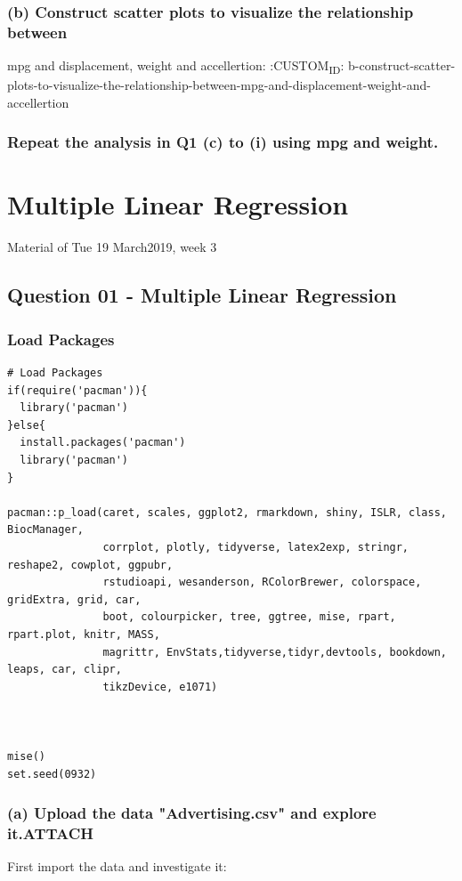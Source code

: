 \documentclass[11pt]{article}
\begin{document}
\subsubsection{(b) Construct scatter plots to visualize the relationship between}
\label{sec:org9a78e63}
mpg and displacement, weight and accellertion:
:CUSTOM\textsubscript{ID}: b-construct-scatter-plots-to-visualize-the-relationship-between-mpg-and-displacement-weight-and-accellertion
\subsubsection{Repeat the analysis in Q1 (c) to (i) using mpg and weight.}
\label{sec:orgc666646}
\section{Multiple Linear Regression}
\label{sec:org6309502}
Material of Tue 19 March2019, week 3

\subsection{Question 01 - Multiple Linear Regression}
\label{sec:orgc6c919e}
\subsubsection{Load Packages}
\label{sec:orgbb30466}

\begin{verbatim}
# Load Packages
if(require('pacman')){
  library('pacman')
}else{
  install.packages('pacman')
  library('pacman')
}

pacman::p_load(caret, scales, ggplot2, rmarkdown, shiny, ISLR, class, BiocManager,
               corrplot, plotly, tidyverse, latex2exp, stringr, reshape2, cowplot, ggpubr,
               rstudioapi, wesanderson, RColorBrewer, colorspace, gridExtra, grid, car,
               boot, colourpicker, tree, ggtree, mise, rpart, rpart.plot, knitr, MASS,
               magrittr, EnvStats,tidyverse,tidyr,devtools, bookdown, leaps, car, clipr,
               tikzDevice, e1071)



mise()
set.seed(0932)
\end{verbatim}

\subsubsection{(a) Upload the data "Advertising.csv" and explore it.\hfill{}\textsc{ATTACH}}
\label{sec:org80f4599}
First import the data and investigate it:
\end{document}
